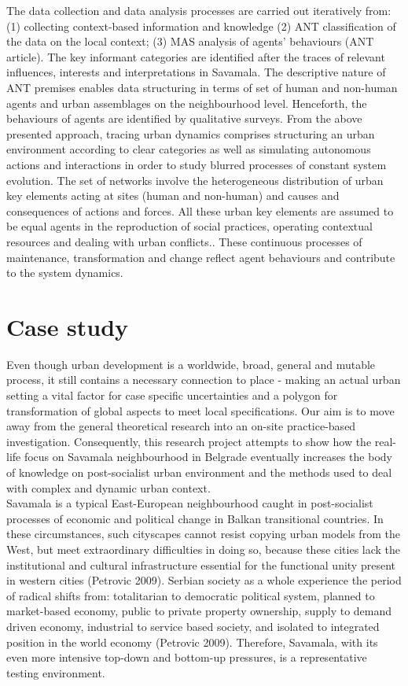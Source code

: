 \documentclass[11pt]{report}
\begin{document}
The data collection and data analysis processes are carried out iteratively from: (1) collecting context-based information and knowledge (2) ANT classification of the data on the local context; (3) MAS analysis of agents’ behaviours (ANT article). The key informant categories are identified after the traces of relevant influences, interests and interpretations in Savamala. The descriptive nature of ANT premises enables data structuring in terms of set of human and non-human agents and urban assemblages on the neighbourhood level. Henceforth, the behaviours of agents are identified by qualitative surveys.
From the above presented approach, tracing urban dynamics comprises structuring an urban environment according to clear categories as well as simulating autonomous actions and interactions in order to study blurred processes of constant system evolution. The set of networks involve the heterogeneous distribution of urban key elements acting at sites (human and non-human) and causes and consequences of actions and forces. All these urban key elements are assumed to be equal agents in the reproduction of social practices, operating contextual resources and dealing with urban conflicts.. These continuous processes of maintenance, transformation and change reflect agent behaviours and contribute to the system dynamics.


\chapter{Case study}

Even though urban development is a worldwide, broad, general and mutable process, it still contains a necessary connection to place - making an actual urban setting a vital factor for case specific uncertainties and a polygon for transformation of global aspects to meet local specifications. Our aim is to move away from the general theoretical research into an on-site practice-based investigation. Consequently, this research project attempts to show how the real-life focus on Savamala neighbourhood in Belgrade eventually increases the body of knowledge on post-socialist urban environment and the methods used to deal with complex and dynamic urban context.
\\
Savamala is a typical East-European neighbourhood caught in post-socialist processes of economic and political change in Balkan transitional countries. In these circumstances, such cityscapes cannot resist copying urban models from the West, but meet extraordinary difficulties in doing so, because these cities lack the institutional and cultural infrastructure essential for the functional unity present in western cities (Petrovic 2009). Serbian society as a whole experience the period of radical shifts from: totalitarian to democratic political system, planned to market-based economy, public to private property ownership, supply to demand driven economy, industrial to service based society, and isolated to integrated position in the world economy (Petrovic 2009). Therefore, Savamala, with its even more intensive top-down and bottom-up pressures, is a representative testing environment. 
\end{document}
